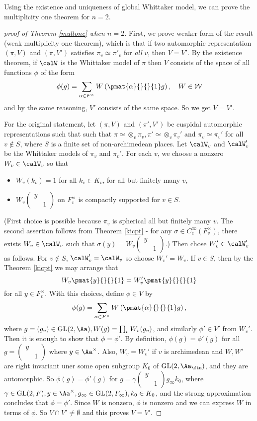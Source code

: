 \documentclass{article}
\newcommand{\GL}{\mathrm{GL}}
\newcommand{\smat}[4]{\left(\begin{smallmatrix} #1 & #2 \\ #3 & #4 \end{smallmatrix}\right)}
\begin{document}
Using the existence and uniqueness of global Whittaker model, we can prove the multiplicity one theorem for $n = 2$. 
\begin{proof}[proof of Theorem \ref{multone} when $n=2$]
First, we prove weaker form of the result (weak multiplicity one theorem), which is that if two automorphic representation $(\pi, V)$ and $(\pi, V')$ satisfies $\pi_{v}\simeq \pi'_{v}$ for \emph{all} $v$, then $V = V'$. 
By the existence theorem, if $\calW$ is the Whittaker model of $\pi$ then $V$ consists of the space of all functions $\phi$ of the form 
$$
\phi(g) = \sum_{\alpha\in F^{\times}} W\left( \pmat{\alpha}{}{}{1}g \right), \quad W\in \cal W
$$
and by the same reasoning, $V'$ consists of the same space. So we get $V = V'$. 

For the original statement, let $(\pi, V)$ and $(\pi', V')$ be cuspidal automorphic representations such that such that $\pi \simeq \otimes_{v}\pi_{v}, \pi'\simeq \otimes_{v}\pi_{v}'$ and $\pi_{v}\simeq \pi_{v}'$ for all $v\not\in S$, where $S$ is a finite set of non-archimedean places. 
Let $\calW_{v}$ and $\calW_{v}'$ be the Whittaker models of $\pi_{v}$ and $\pi_{v}'$. 
For each $v$, we choose a nonzero $W_{v}\in \calW_{v}$ so that 
\begin{itemize}
\item $W_{v}(k_{v}) = 1$ for all $k_{v}\in K_{v}$, for all but finitely many $v$, 
\item $W_{v}\smat{y}{}{}{1}$ on $F_{v}^{\times}$ is compactly supported  for $v\in S$. 
\end{itemize}
(First choice is possible because $\pi_v$ is spherical all but finitely many $v$. The second assertion follows from Theorem \ref{kicpt} - for any $\sigma \in C_{c}^{\infty}(F_{v}^{\times})$, there exists $W_v \in \calW_v$ such that $\sigma(y) = W_{v} \smat{y}{}{}{1}$.)  
Then chose $W_{v}'\in \calW_{v}'$ as follows. 
For $v\not\in S$, $\calW_{v}' = \calW_{v}$ so choose $W_{v}' = W_{v}$. 
If $v\in S$, then by the Theorem \ref{kicpt} we may arrange that 
$$
W_{v}\pmat{y}{}{}{1} = W_{v}'\pmat{y}{}{}{1}
$$
for all $y\in F_{v}^{\times}$. 
With this choices, define $\phi\in V$ by 
$$
\phi(g) = \sum_{\alpha\in F^{\times}} W\left(\pmat{\alpha}{}{}{1}g \right), 
$$
where $g = (g_{v})\in \GL(2, \Aa), W(g) = \prod_{v} W_{v}(g_{v})$, and similarly $\phi'\in V'$ from $W_{v}'$. 
Then it is enough to show that $\phi = \phi'$. 
By definition, $\phi(g) = \phi'(g)$ for all $g = \smat{y}{}{}{1}$ where $y\in \Aa^{\times}$. 
Also, $W_{v}= W_{v}'$ if $v$ is archimedean and $W, W'$ are right invariant uner some open subgroup $K_{0}$ of $\GL(2, \Aa_{\fin})$, and they are automorphic. So $\phi(g) = \phi'(g)$ for $g = \gamma\smat{y}{}{}{1} g_{\infty}k_{0}$, where $\gamma\in \GL(2, F), y\in \Aa^{\times}, g_{\infty}\in \GL(2, F_{\infty}), k_{0}\in K_{0}$, and the strong approximation concludes that $\phi = \phi'$. 
Since $W$ is nonzero, $\phi$ is nonzero and we can express $W$ in terms of $\phi$. So $V\cap V'\neq\emptyset$ and this proves $V = V'$.  
\end{proof}
\end{document}

